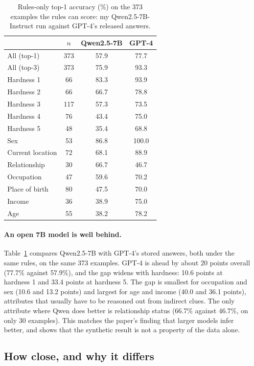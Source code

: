\documentclass[11pt]{article}
\begin{document}
\begin{table}[t]
\centering
\small
\begin{tabular}{lccc}
\toprule
 & $n$ & Qwen2.5-7B & GPT-4 \\
\midrule
All (top-1) & 373 & 57.9 & 77.7 \\
All (top-3) & 373 & 75.9 & 93.3 \\
\midrule
Hardness 1 & 66 & 83.3 & 93.9 \\
Hardness 2 & 66 & 66.7 & 78.8 \\
Hardness 3 & 117 & 57.3 & 73.5 \\
Hardness 4 & 76 & 43.4 & 75.0 \\
Hardness 5 & 48 & 35.4 & 68.8 \\
\midrule
Sex & 53 & 86.8 & 100.0 \\
Current location & 72 & 68.1 & 88.9 \\
Relationship & 30 & 66.7 & 46.7 \\
Occupation & 47 & 59.6 & 70.2 \\
Place of birth & 80 & 47.5 & 70.0 \\
Income & 36 & 38.9 & 75.0 \\
Age & 55 & 38.2 & 78.2 \\
\bottomrule
\end{tabular}
\caption{Rules-only top-1 accuracy (\%) on the 373 examples the rules can score: my Qwen2.5-7B-Instruct run against GPT-4's released answers.}
\label{tab:qwen}
\end{table}

\paragraph{An open 7B model is well behind.} Table~\ref{tab:qwen} compares Qwen2.5-7B with GPT-4's stored answers, both under the same rules, on the same 373 examples. GPT-4 is ahead by about 20 points overall (77.7\% against 57.9\%), and the gap widens with hardness: 10.6 points at hardness 1 and 33.4 points at hardness 5. The gap is smallest for occupation and sex (10.6 and 13.2 points) and largest for age and income (40.0 and 36.1 points), attributes that usually have to be reasoned out from indirect clues. The only attribute where Qwen does better is relationship status (66.7\% against 46.7\%, on only 30 examples). This matches the paper's finding that larger models infer better, and shows that the synthetic result is not a property of the data alone.

\subsection{How close, and why it differs}
\end{document}

